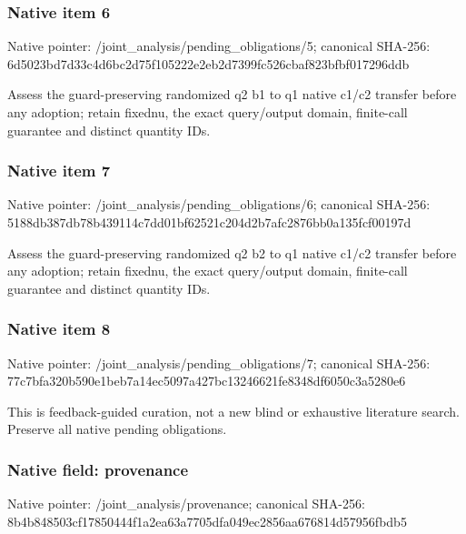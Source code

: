 \documentclass[10pt,a4paper]{article}
\begin{document}
\subsubsection{Native item 6}
Native pointer: /joint\_\allowbreak{}analysis/pending\_\allowbreak{}obligations/5; canonical SHA-256: 6d5023bd7d33c4d6bc2d75f105222e2eb2d7399fc526cbaf823bfbf017296ddb

\begingroup\raggedright\sloppy Assess the guard-preserving randomized q2 b1 to q1 native c1/\allowbreak{}c2 transfer before any adoption;\allowbreak{} retain fixednu,\allowbreak{} the exact query/\allowbreak{}output domain,\allowbreak{} finite-call guarantee and distinct quantity IDs.\par\endgroup

\subsubsection{Native item 7}
Native pointer: /joint\_\allowbreak{}analysis/pending\_\allowbreak{}obligations/6; canonical SHA-256: 5188db387db78b439114c7dd01bf62521c204d2b7afc2876bb0a135fcf00197d

\begingroup\raggedright\sloppy Assess the guard-preserving randomized q2 b2 to q1 native c1/\allowbreak{}c2 transfer before any adoption;\allowbreak{} retain fixednu,\allowbreak{} the exact query/\allowbreak{}output domain,\allowbreak{} finite-call guarantee and distinct quantity IDs.\par\endgroup

\subsubsection{Native item 8}
Native pointer: /joint\_\allowbreak{}analysis/pending\_\allowbreak{}obligations/7; canonical SHA-256: 77c7bfa320b590e1beb7a14ec5097a427bc13246621fe8348df6050c3a5280e6

\begingroup\raggedright\sloppy This is feedback-guided curation,\allowbreak{} not a new blind or exhaustive literature search. Preserve all native pending obligations.\par\endgroup

\subsubsection{Native field: provenance}
Native pointer: /joint\_\allowbreak{}analysis/provenance; canonical SHA-256: 8b4b848503cf17850444f1a2ea63a7705dfa049ec2856aa676814d57956fbdb5
\end{document}
